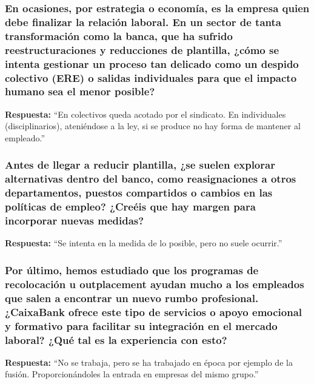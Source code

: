 
\subsubsection*{En ocasiones, por estrategia o economía, es la empresa quien debe finalizar la relación laboral. En un sector de tanta transformación como la banca, que ha sufrido reestructuraciones y reducciones de plantilla, ¿cómo se intenta gestionar un proceso tan delicado como un despido colectivo (ERE) o salidas individuales para que el impacto humano sea el menor posible?}

\textbf{Respuesta:}\newline
``En colectivos queda acotado por el sindicato. En individuales (disciplinarios), ateniéndose a la ley, si se produce no hay forma de mantener al empleado.''

\subsubsection*{Antes de llegar a reducir plantilla, ¿se suelen explorar alternativas dentro del banco, como reasignaciones a otros departamentos, puestos compartidos o cambios en las políticas de empleo? ¿Creéis que hay margen para incorporar nuevas medidas?}

\textbf{Respuesta:} \newline
``Se intenta en la medida de lo posible, pero no suele ocurrir.''

\subsubsection*{Por último, hemos estudiado que los programas de recolocación u outplacement ayudan mucho a los empleados que salen a encontrar un nuevo rumbo profesional. ¿CaixaBank ofrece este tipo de servicios o apoyo emocional y formativo para facilitar su integración en el mercado laboral? ¿Qué tal es la experiencia con esto?}

\textbf{Respuesta:}\newline
``No se trabaja, pero se ha trabajado en época por ejemplo de la fusión. Proporcionándoles la entrada en empresas del mismo grupo.''

